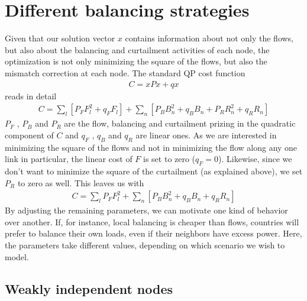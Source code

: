 \documentclass[english,twoside,a4paper,11pt]{article}
\numberwithin{equation}{section}
\begin{document}
\section{Different balancing strategies}
\label{sec:4}

Given that our solution vector $x$ contains information about not only
the flows, but also about the balancing and curtailment activities of
each node, the optimization is not only minimizing the square of the
flows, but also the mismatch correction at each node. The standard QP
cost function
\begin{align*}
C=xPx+qx
\end{align*}
reads in detail
\begin{align*}
C=\sum_l \left[P_F F_l^2+ q_F F_l\right]
+\sum_n \left[P_B B_n^2+ q_B B_n + P_R R_n^2 +q_R R_n\right]
\end{align*}
$P_F$ , $P_B$ and $P_R$ are the flow, balancing and curtailment
prizing in the quadratic component of $C$ and $q_F$ , $q_B$ and $q_R$
are linear ones. As we are interested in minimizing the square of the
flows and not in minimizing the flow along any one link in
particular, the linear cost of $F$ is set to zero ($q_F=0$). Likewise,
since we don't want to minimize the square of the
curtailment (as explained above), we set $P_R$ to zero as well. This
leaves us with
\begin{align*}
C=\sum_l P_F F_l^2 +\sum_n \left[P_B B_n^2 +q_B B_n+q_R R_n \right]
\end{align*}
By adjusting the remaining parameters, we can motivate one kind of
behavior over another. If, for instance, local balancing is cheaper
than flows, countries will prefer to balance their own loads, even if
their neighbors have excess power. Here, the parameters take different
values, depending on which scenario we wish to model.

\subsection{Weakly independent nodes}
\end{document}
